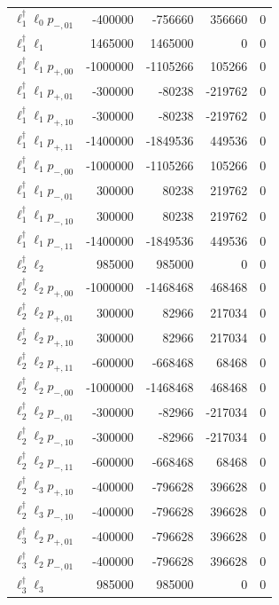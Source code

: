 \begin{longtable}{@{}lrrrr@{}}
$\ell_{1}^\dagger \ell_{0} p_{-,01}$ & -400000 & -756660 & 356660 & 0 \\
$\ell_{1}^\dagger \ell_{1}$ & 1465000 & 1465000 & 0 & 0 \\
$\ell_{1}^\dagger \ell_{1} p_{+,00}$ & -1000000 & -1105266 & 105266 & 0 \\
$\ell_{1}^\dagger \ell_{1} p_{+,01}$ & -300000 & -80238 & -219762 & 0 \\
$\ell_{1}^\dagger \ell_{1} p_{+,10}$ & -300000 & -80238 & -219762 & 0 \\
$\ell_{1}^\dagger \ell_{1} p_{+,11}$ & -1400000 & -1849536 & 449536 & 0 \\
$\ell_{1}^\dagger \ell_{1} p_{-,00}$ & -1000000 & -1105266 & 105266 & 0 \\
$\ell_{1}^\dagger \ell_{1} p_{-,01}$ & 300000 & 80238 & 219762 & 0 \\
$\ell_{1}^\dagger \ell_{1} p_{-,10}$ & 300000 & 80238 & 219762 & 0 \\
$\ell_{1}^\dagger \ell_{1} p_{-,11}$ & -1400000 & -1849536 & 449536 & 0 \\
$\ell_{2}^\dagger \ell_{2}$ & 985000 & 985000 & 0 & 0 \\
$\ell_{2}^\dagger \ell_{2} p_{+,00}$ & -1000000 & -1468468 & 468468 & 0 \\
$\ell_{2}^\dagger \ell_{2} p_{+,01}$ & 300000 & 82966 & 217034 & 0 \\
$\ell_{2}^\dagger \ell_{2} p_{+,10}$ & 300000 & 82966 & 217034 & 0 \\
$\ell_{2}^\dagger \ell_{2} p_{+,11}$ & -600000 & -668468 & 68468 & 0 \\
$\ell_{2}^\dagger \ell_{2} p_{-,00}$ & -1000000 & -1468468 & 468468 & 0 \\
$\ell_{2}^\dagger \ell_{2} p_{-,01}$ & -300000 & -82966 & -217034 & 0 \\
$\ell_{2}^\dagger \ell_{2} p_{-,10}$ & -300000 & -82966 & -217034 & 0 \\
$\ell_{2}^\dagger \ell_{2} p_{-,11}$ & -600000 & -668468 & 68468 & 0 \\
$\ell_{2}^\dagger \ell_{3} p_{+,10}$ & -400000 & -796628 & 396628 & 0 \\
$\ell_{2}^\dagger \ell_{3} p_{-,10}$ & -400000 & -796628 & 396628 & 0 \\
$\ell_{3}^\dagger \ell_{2} p_{+,01}$ & -400000 & -796628 & 396628 & 0 \\
$\ell_{3}^\dagger \ell_{2} p_{-,01}$ & -400000 & -796628 & 396628 & 0 \\
$\ell_{3}^\dagger \ell_{3}$ & 985000 & 985000 & 0 & 0 \\

\end{longtable}
